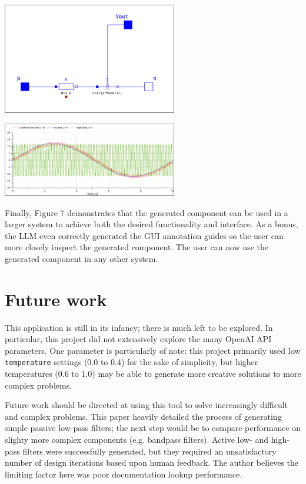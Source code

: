 \documentclass[11pt]{article}
\let\oldsection\section
\renewcommand\section{\clearpage\oldsection}
\begin{document}
\begin{center}
\includegraphics[width=3in]{./images/passive_lowpass_generated_v2.png}
\end{center}

\begin{center}
\includegraphics[width=3in]{./images/passive_lowpass_final_output.png}
\end{center}

Finally, Figure 7 demonstrates that the generated component can be used in a larger system to achieve both the desired functionality and interface. As a bonus, the LLM even correctly generated the GUI annotation guides so the user can more closely inspect the generated component. The user can now use the generated component in any other system.

\section{Future work}
\label{sec:org775bc7a}
This application is still in its infancy; there is much left to be explored. In particular, this project did not extensively explore the many OpenAI API parameters. One parameter is particularly of note: this project primarily used low \texttt{temperature} settings (0.0 to 0.4) for the sake of simplicity, but higher temperatures (0.6 to 1.0) may be able to generate more creative solutions to more complex problems.

Future work should be directed at using this tool to solve increasingly difficult and complex problems. This paper heavily detailed the process of generating simple passive low-pass filters; the next step would be to compare performance on slighty more complex components (e.g. bandpass filters). Active low- and high-pass filters were successfully generated, but they required an unsatisfactory number of design iterations based upon human feedback. The author believes the limiting factor here was poor documentation lookup performance.
\end{document}
